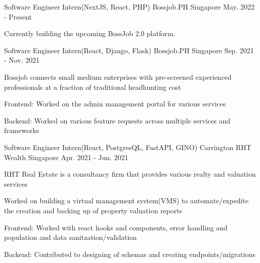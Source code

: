 

\begin{cventries}

  \cventry
    {Software Engineer Intern(NextJS, React, PHP)} %
    {Bossjob.PH} %
    {Singapore} %
    {May. 2022 - Present} %
    {
      \begin{cvitems} %
        \item {Currently building the upcoming BossJob 2.0 platform.}
      \end{cvitems}
    }
  \cventry
    {Software Engineer Intern(React, Django, Flask)} %
    {Bossjob.PH} %
    {Singapore} %
    {Sep. 2021 - Nov. 2021} %
    {
      \begin{cvitems} %
        \item {Bossjob connects small medium enterprises with pre-screened experienced professionals at a fraction of traditional headhunting cost}
	\item {Frontend: Worked on the admin management portal for various services}
	\item {Backend: Worked on various feature requests across multiple services and frameworks}
      \end{cvitems}
    }
  \cventry
    {Software Engineer Intern(React, PostgresQL, FastAPI, GINO)} %
    {Carrington RHT Wealth} %
    {Singapore} %
    {Apr. 2021 - Jun. 2021} %
    {
      \begin{cvitems} %
      	\item {RHT Real Estate is a consultancy firm that provides various realty and valuation services}
        \item {Worked on building a virtual management system(VMS) to automate/expedite the creation and backing up of property valuation reports}
        \item {Frontend: Worked with react hooks and components,  error handling and population and data sanitzation/validation}
        \item {Backend: Contributed to designing of schemas and creating endpoints/migrations}
      \end{cvitems}
    }

\end{cventries}
